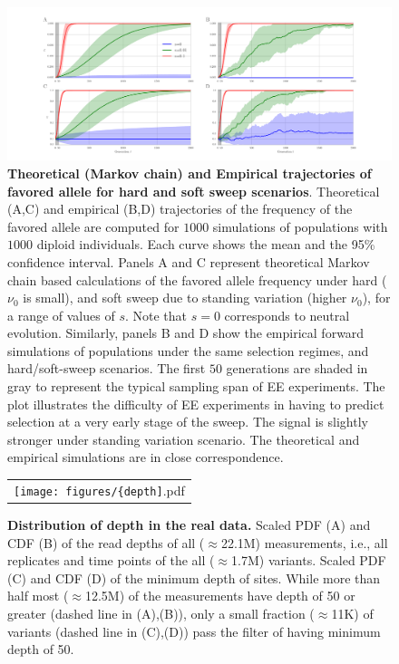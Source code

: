 \begin{figure}[H]
	\includegraphics[trim=1in 0.1in 1in 
	0.1in,clip,width=\textwidth]{figures/AF.pdf}
	\caption{{\bf Theoretical (Markov chain) and Empirical
            trajectories of favored allele for hard and soft sweep
            scenarios}.  Theoretical (A,C) and empirical (B,D) trajectories of 
            the
          frequency of the favored allele are computed for $1000$ 
          simulations of populations with 
          $1000$ diploid individuals. Each curve shows the mean and the 95\% 
          confidence
          interval.  Panels A and C represent theoretical Markov chain
          based calculations of the favored allele frequency under
          hard ($\nu_0$ is small), and soft sweep due to standing
          variation (higher $\nu_0$), for a range of values of
          $s$. Note that $s=0$ corresponds to neutral
          evolution. Similarly, panels B and D show the empirical
          forward simulations of populations under the same selection
          regimes, and hard/soft-sweep scenarios. The first $50$
          generations are shaded in gray to represent the typical
          sampling span of EE experiments. The plot illustrates the
          difficulty of EE experiments in having to predict selection
          at a very early stage of the sweep. The signal is slightly
          stronger under standing variation scenario. The theoretical
          and empirical simulations are in close correspondence. }
	\label{fig:sweep}
\end{figure}

\begin{figure}[H]
	\centering
	\begin{tabular}{c}
		\texttt{[image: figures/\{depth]}.pdf}
	\end{tabular}
	\caption{ {\bf Distribution of depth in the real data.}
		 Scaled PDF (A) and CDF (B) of the read depths of all ($\approx$22.1M) 
		 measurements, i.e., all replicates and time points of the all 
		 ($\approx$1.7M) variants.
		 Scaled PDF (C) and CDF (D) of the minimum depth of sites. While more 
		 than half 
		 most ($\approx$12.5M) of the measurements have depth of 50 or greater 
		 (dashed line in (A),(B)), only a small fraction ($\approx$11K) of 
		 variants (dashed line in (C),(D)) pass the filter of having minimum 
		 depth of 50.}  
	\label{fig:depth}
\end{figure}


